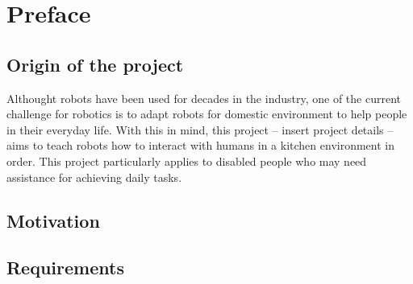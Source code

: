 
\chapter{Preface}


\section{Origin of the project}

Althought robots have been used for decades in the industry, one of the current challenge for robotics is to adapt robots for domestic environment to help people in their everyday life. With this in mind, this project -- insert project details -- aims to teach robots how to interact with humans in a kitchen environment in order. This project particularly applies to disabled people who may need assistance for achieving daily tasks.   


\section{Motivation}


\section{Requirements}

